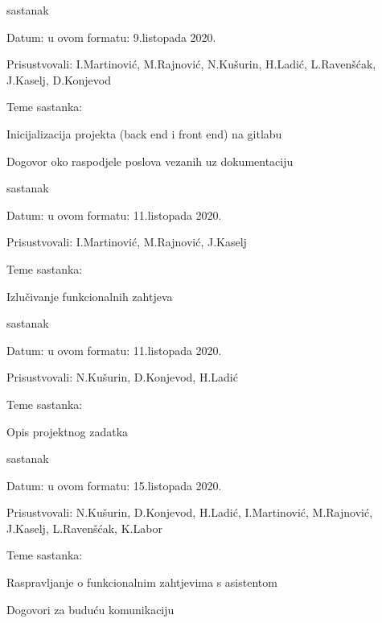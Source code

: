 \begin{packed_enum}
			\item  sastanak
			\item[] \begin{packed_item}
				\item Datum: u ovom formatu: 9.listopada 2020.
				\item Prisustvovali: I.Martinović, M.Rajnović, N.Kušurin, H.Ladić, L.Ravenšćak, J.Kaselj, D.Konjevod
				\item Teme sastanka:
				\begin{packed_item}
					\item   Inicijalizacija projekta (back end i front end) na gitlabu
					\item   Dogovor oko raspodjele poslova vezanih uz dokumentaciju
				\end{packed_item}
			\end{packed_item}
	
			\item sastanak
			\item[] \begin{packed_item}
				\item Datum: u ovom formatu: 11.listopada 2020.
				\item Prisustvovali: I.Martinović, M.Rajnović, J.Kaselj
				\item Teme sastanka:
				\begin{packed_item}
					\item   Izlučivanje funkcionalnih zahtjeva
				\end{packed_item}
			\end{packed_item}
		
			\item sastanak
			\item[] \begin{packed_item}
				\item Datum: u ovom formatu: 11.listopada 2020.
				\item Prisustvovali: N.Kušurin, D.Konjevod, H.Ladić
				\item Teme sastanka:
				\begin{packed_item}
					\item   Opis projektnog zadatka
				\end{packed_item}
			\end{packed_item}
		
		\item sastanak
		\item[] \begin{packed_item}
			\item Datum: u ovom formatu: 15.listopada 2020.
			\item Prisustvovali: N.Kušurin, D.Konjevod, H.Ladić, I.Martinović, M.Rajnović, J.Kaselj, L.Ravenšćak,  K.Labor
			\item Teme sastanka: 
			\begin{packed_item}
				\item   Raspravljanje o funkcionalnim zahtjevima s asistentom
				\item 	Dogovori za buduću komunikaciju
			\end{packed_item}
		\end{packed_item}
	

\end{packed_enum}
